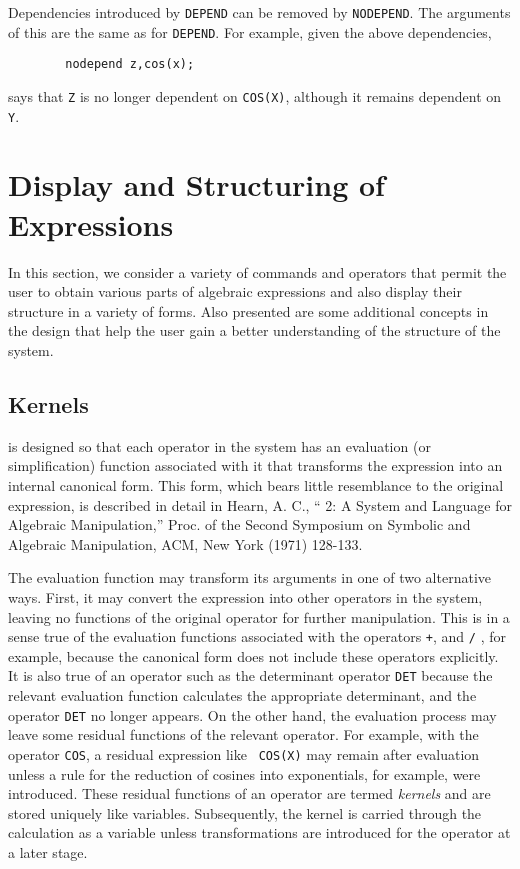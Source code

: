 Dependencies introduced by {\tt DEPEND} can be removed by {\tt NODEPEND}.
 The arguments of this are the same as for {\tt DEPEND}.
For example, given the above dependencies,
\begin{verbatim}
        nodepend z,cos(x);
\end{verbatim}
says that {\tt Z} is no longer dependent on {\tt COS(X)}, although it remains
dependent on {\tt Y}.

\chapter{Display and Structuring of Expressions}
In this section, we consider a variety of commands and operators that
permit the user to obtain various parts of algebraic expressions and also
display their structure in a variety of forms. Also presented are some
additional concepts in the {\REDUCE} design that help the user gain a better
understanding of the structure of the system.

\section{Kernels}
{\REDUCE} is designed so that each operator in the system has an
evaluation (or simplification) function associated
with it that transforms the expression into an internal canonical form.
  This form, which bears little resemblance to the
original expression, is described in detail in Hearn, A. C., ``{\REDUCE} 2:
A System and Language for Algebraic Manipulation,'' Proc. of the Second
Symposium on Symbolic and Algebraic Manipulation, ACM, New York (1971)
128-133.

The evaluation function may transform its arguments in one of two
alternative ways.  First, it may convert the expression into other
operators in the system, leaving no functions of the original operator for
further manipulation.  This is in a sense true of the evaluation functions
associated with the operators {\tt +}, {\tt *} and {\tt /} , for example,
because the canonical form does not include these
operators explicitly.  It is also true of an operator such as the
determinant operator {\tt DET} because the relevant
evaluation function calculates the appropriate determinant, and the
operator {\tt DET} no longer appears.  On the other hand, the evaluation
process may leave some residual functions of the relevant operator.  For
example, with the operator {\tt COS}, a residual expression like {\tt
COS(X)} may remain after evaluation unless a rule for the reduction of
cosines into exponentials, for example, were introduced.  These residual
functions of an operator are termed {\em kernels\/} and are
stored uniquely like variables.  Subsequently, the kernel is carried
through the calculation as a variable unless transformations are
introduced for the operator at a later stage.

